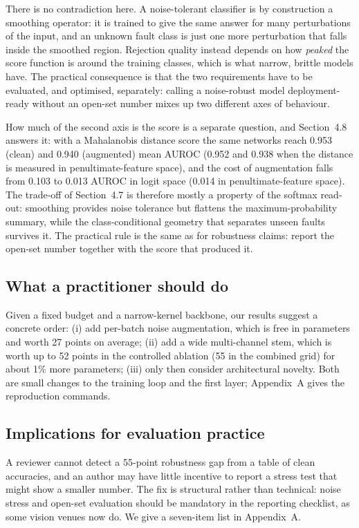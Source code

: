 There is no contradiction here. A noise-tolerant classifier is by construction a smoothing operator: it is trained to give the same answer for many perturbations of the input, and an unknown fault class is just one more perturbation that falls inside the smoothed region. Rejection quality instead depends on how \emph{peaked} the score function is around the training classes, which is what narrow, brittle models have. The practical consequence is that the two requirements have to be evaluated, and optimised, separately: calling a noise-robust model deployment-ready without an open-set number mixes up two different axes of behaviour.

How much of the second axis is the score is a separate question, and Section~4.8 answers it: with a Mahalanobis distance score the same networks reach 0.953 (clean) and 0.940 (augmented) mean AUROC (0.952 and 0.938 when the distance is measured in penultimate-feature space), and the cost of augmentation falls from 0.103 to 0.013 AUROC in logit space (0.014 in penultimate-feature space). The trade-off of Section~4.7 is therefore mostly a property of the softmax read-out: smoothing provides noise tolerance but flattens the maximum-probability summary, while the class-conditional geometry that separates unseen faults survives it. The practical rule is the same as for robustness claims: report the open-set number together with the score that produced it.

\subsection{What a practitioner should do}
Given a fixed budget and a narrow-kernel backbone, our results suggest a concrete order: (i) add per-batch noise augmentation, which is free in parameters and worth 27 points on average; (ii) add a wide multi-channel stem, which is worth up to 52 points in the controlled ablation (55 in the combined grid) for about 1\% more parameters; (iii) only then consider architectural novelty. Both are small changes to the training loop and the first layer; Appendix~A gives the reproduction commands.

\subsection{Implications for evaluation practice}
A reviewer cannot detect a 55-point robustness gap from a table of clean accuracies, and an author may have little incentive to report a stress test that might show a smaller number. The fix is structural rather than technical: noise stress and open-set evaluation should be mandatory in the reporting checklist, as some vision venues now do. We give a seven-item list in Appendix~A.

